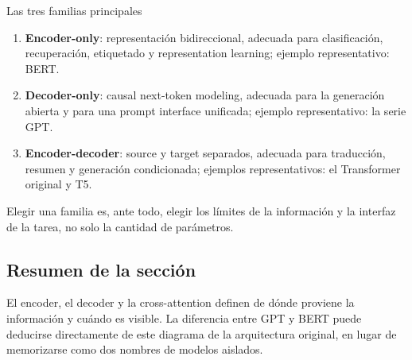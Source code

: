 \begin{importantbox}{Las tres familias principales}
\begin{enumerate}
  \item \textbf{Encoder-only}: representación bidireccional, adecuada para clasificación, recuperación, etiquetado y representation learning; ejemplo representativo: BERT.
  \item \textbf{Decoder-only}: causal next-token modeling, adecuada para la generación abierta y para una prompt interface unificada; ejemplo representativo: la serie GPT.
  \item \textbf{Encoder-decoder}: source y target separados, adecuada para traducción, resumen y generación condicionada; ejemplos representativos: el Transformer original y T5.
\end{enumerate}
Elegir una familia es, ante todo, elegir los límites de la información y la interfaz de la tarea, no solo la cantidad de parámetros.
\end{importantbox}

\subsection{Resumen de la sección}

El encoder, el decoder y la cross-attention definen de dónde proviene la información y cuándo es visible. La diferencia entre GPT y BERT puede deducirse directamente de este diagrama de la arquitectura original, en lugar de memorizarse como dos nombres de modelos aislados.

